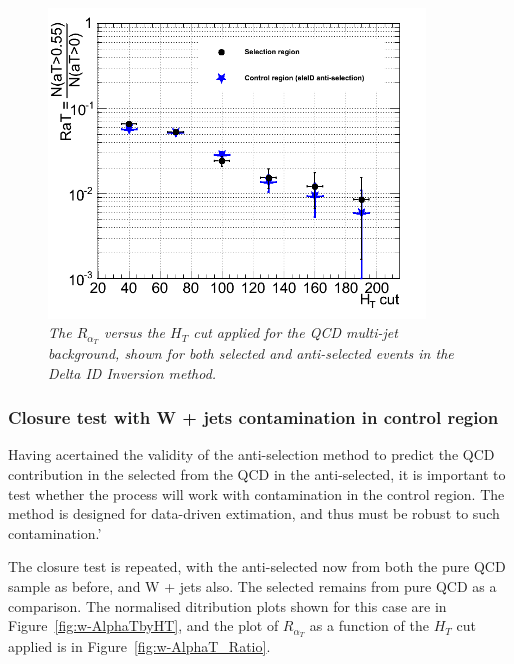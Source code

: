 \begin{figure}[h!]
\begin{center}
\includegraphics[width=100mm]{Plots/mc-alphaTratio}
\end{center}
\caption{\textit{The $R_{\alpha_T}$ versus the $H_{T}$ cut applied for the QCD multi-jet background, shown for both selected and anti-selected events in the Delta ID Inversion method.}}
\label{fig:AlphaT_Ratio}
\end{figure}

\subsubsection {Closure test with W + jets contamination in control region}

Having acertained the validity of the anti-selection method to predict the QCD contribution in the selected from the QCD in the anti-selected, it is important to test whether the process will work with contamination in the control region. The method is designed for data-driven extimation, and thus must be robust to such contamination.'

The closure test is repeated, with the anti-selected now from both the pure QCD sample as before, and W + jets also. The selected remains from pure QCD as a comparison. The normalised ditribution plots shown for this case are in Figure~\ref{fig:w-AlphaTbyHT}, and the plot of $R_{\alpha_T}$ as a function of the $H_{T}$ cut applied is in Figure~\ref{fig:w-AlphaT_Ratio}. 

